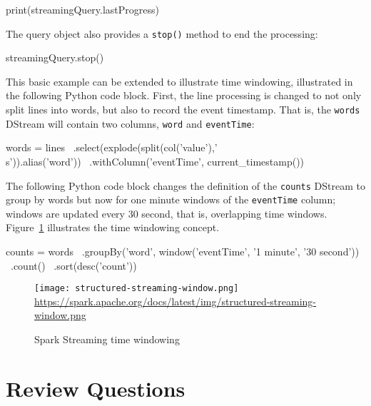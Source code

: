 \begin{pythoncode}
print(streamingQuery.lastProgress)
\end{pythoncode}

The query object also provides a \texttt{stop()} method to end the processing:

\begin{pythoncode}
streamingQuery.stop()
\end{pythoncode}

This basic example can be extended to illustrate time windowing, illustrated in the following Python code block. First, the line processing is changed to not only split lines into words, but also to record the event timestamp. That is, the \texttt{words} DStream will contain two columns, \texttt{word} and \texttt{eventTime}:

\begin{samepage}
\begin{pythoncode}
words = lines \
    .select(explode(split(col('value'),'\\s')).alias('word')) \
    .withColumn('eventTime', current_timestamp())
\end{pythoncode}
\end{samepage}

The following Python code block changes the definition of the \texttt{counts} DStream to group by words but now for one minute windows of the \texttt{eventTime} column; windows are updated every 30 second, that is, overlapping time windows. Figure~\ref{fig:streamingtimewindow} illustrates the time windowing concept.

\begin{samepage}
\begin{pythoncode}
counts = words \
    .groupBy('word', window('eventTime', '1 minute', '30 second')) \
    .count() \
    .sort(desc('count'))
\end{pythoncode}
\end{samepage}

\begin{figure}
\centering
\texttt{[image: structured-streaming-window.png]} \\

\scriptsize\url{https://spark.apache.org/docs/latest/img/structured-streaming-window.png}
\caption{Spark Streaming time windowing}
\label{fig:streamingtimewindow}
\end{figure}

\FloatBarrier
\section{Review Questions}
